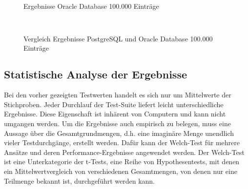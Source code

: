 \begin{figure}[H]
\centering
\\
\caption{Ergebnisse Oracle Database 100.000 Einträge}
\end{figure}

\begin{figure}[H]
\centering
\\
\caption{Vergleich Ergebnisse PostgreSQL und Oracle Database 100.000 Einträge}
\end{figure}

%	
%		
%			

\subsection{Statistische Analyse der Ergebnisse}

Bei den vorher gezeigten Testwerten handelt es sich nur um Mittelwerte der Stichproben. Jeder Durchlauf der Test-Suite liefert leicht unterschiedliche Ergebnisse. Diese Eigenschaft ist inhärent von Computern und kann nicht umgangen werden. Um die Ergebnisse auch empirisch zu belegen, muss eine Aussage über die Gesamtgrundmengen, d.h. eine imaginäre Menge unendlich vieler Testdurchgänge, erstellt werden. Dafür kann der Welch-Test für mehrere Ansätze und deren Performance-Ergebnisse angewendet werden. Der Welch-Test ist eine Unterkategorie der t-Tests, eine Reihe von Hypothesentests, mit denen ein Mittelwertvergleich von verschiedenen Gesamtmengen, von denen nur eine Teilmenge bekannt ist, durchgeführt werden kann.


